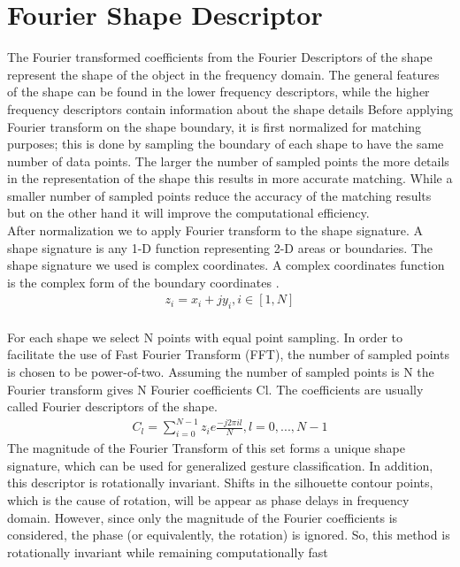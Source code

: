 \section{Fourier Shape Descriptor } \label{FDT}
The Fourier transformed coefficients from the Fourier
Descriptors of the shape represent the shape of the object in
the frequency domain. The general features of the shape can
be found in the lower frequency descriptors, while the higher
frequency descriptors contain information about the shape
details \cite{20}
Before applying Fourier transform on the shape boundary, it
is first normalized for matching purposes; this is done by
sampling the boundary of each shape to have the same number
of data points. The larger the number of sampled points the
more details in the representation of the shape this results in
more accurate matching. While a smaller number of sampled
points reduce the accuracy of the matching results but on the
other hand it will improve the computational efficiency. \\

After normalization we to apply Fourier transform to the
shape signature. A shape signature is any 1-D function
representing 2-D areas or boundaries. The shape signature we
used is complex coordinates. A complex coordinates function
is the complex form of the boundary coordinates \cite{20}. \\
\begin{gather}
    z_{i} = x_{i}+j y_{i} , i\in [1,N]
\end{gather}\\
For each shape we select N points with equal point
sampling. In order to facilitate the use of Fast Fourier
Transform (FFT), the number of sampled points is chosen to
be power-of-two. Assuming the number of sampled points is
N the Fourier transform gives N Fourier coefficients Cl. The
coefficients are usually called Fourier descriptors of the shape. 
\begin{gather}
C_{l}= \sum_{i=0}^{N-1} z_{i}e{\frac{-j 2\pi il}{N}} , l = 0,...,N-1
\end{gather}
The magnitude of the Fourier
Transform of this set forms a unique shape signature, which can be used for generalized
gesture classification.
In addition, this descriptor is rotationally invariant. Shifts in the silhouette contour
points, which is the cause of rotation, will be appear as phase delays in frequency
domain. However, since only the magnitude of the Fourier coefficients is considered,
the phase (or equivalently, the rotation) is ignored. So, this method is rotationally
invariant while remaining computationally fast\\


